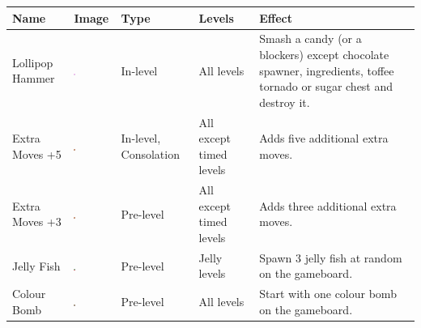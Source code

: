 
    \begin{tabular}{
  >{\raggedright\arraybackslash}m{.1\linewidth} %
  >{\centering\arraybackslash}m{.05\linewidth} %
  >{\arraybackslash}m{.1\linewidth} %
  >{\raggedright\arraybackslash}m{.1\linewidth} %
  >{\arraybackslash}m{.35\linewidth} %
}
    \toprule
    \textbf{Name} & \textbf{Image} & \textbf{Type} & \textbf{Levels} & \textbf{Effect} \\
    \midrule
    Lollipop Hammer & 
    \includegraphics[width=0.04\textwidth]{masters-thesis-master/masters-thesis/contents/a_appendix/booster_images/Booster_lollipop_hammer.png} &
    In-level &
    All levels &
    Smash a candy (or a blockers) except chocolate spawner, ingredients, toffee tornado or sugar chest and destroy it.\\ 
    Extra Moves +5 & 
    \includegraphics[width=0.04\textwidth]{masters-thesis-master/masters-thesis/contents/a_appendix/booster_images/Booster_extra_moves_5.png} &
    In-level, Consolation &
    All except timed levels &
    Adds five additional extra moves.\\ 
    Extra Moves +3 & 
    \includegraphics[width=0.04\textwidth]{masters-thesis-master/masters-thesis/contents/a_appendix/booster_images/Booster_extra_moves_3.png} &
    Pre-level &
    All except timed levels &
    Adds three additional extra moves.\\
    Jelly Fish & 
    \includegraphics[width=0.04\textwidth]{masters-thesis-master/masters-thesis/contents/a_appendix/booster_images/Booster_jelly_fish.png} &
    Pre-level &
    Jelly levels &
    Spawn 3 jelly fish at random on the gameboard.\\ 
    Colour Bomb & 
    \includegraphics[width=0.04\textwidth]{masters-thesis-master/masters-thesis/contents/a_appendix/booster_images/Booster_color_bomb.png} &
    Pre-level &
    All levels &
    Start with one colour bomb on the gameboard.\\ 

\end{tabular}
